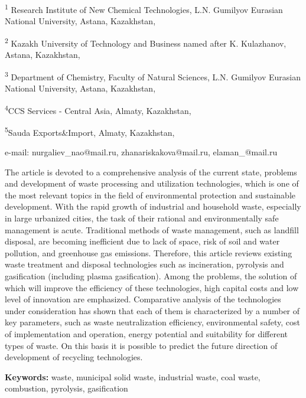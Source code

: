 \begin{articleheader}
\textsuperscript{1} Research Institute of New Chemical Technologies, L.N. Gumilyov Eurasian National University, Astana, Kazakhstan,

\textsuperscript{2} Kazakh University of Technology and Business named after K. Kulazhanov, Astana, Kazakhstan,

\textsuperscript{3} Department of Chemistry, Faculty of Natural Sciences, L.N. Gumilyov Eurasian National University, Astana, Kazakhstan,

\textsuperscript{4}CCS Services - Central Asia, Almaty, Kazakhstan,

\textsuperscript{5}Sauda Exports\&Import, Almaty, Kazakhstan,

e-mail: nurgaliev\_nao@mail.ru, zhanariskakova@mail.ru, elaman\_@mail.ru
\end{articleheader}
\vspace{-1em}
The article is devoted to a comprehensive analysis of the current state,
problems and development of waste processing and utilization
technologies, which is one of the most relevant topics in the field of
environmental protection and sustainable development. With the rapid
growth of industrial and household waste, especially in large urbanized
cities, the task of their rational and environmentally safe management
is acute. Traditional methods of waste management, such as landfill
disposal, are becoming inefficient due to lack of space, risk of soil
and water pollution, and greenhouse gas emissions. Therefore, this
article reviews existing waste treatment and disposal technologies such
as incineration, pyrolysis and gasification (including plasma
gasification). Among the problems, the solution of which will improve
the efficiency of these technologies, high capital costs and low level
of innovation are emphasized. Comparative analysis of the technologies
under consideration has shown that each of them is characterized by a
number of key parameters, such as waste neutralization efficiency,
environmental safety, cost of implementation and operation, energy
potential and suitability for different types of waste. On this basis it
is possible to predict the future direction of development of recycling
technologies.

{\bfseries Keywords:} waste, municipal solid waste, industrial waste, coal
waste, combustion, pyrolysis, gasification

